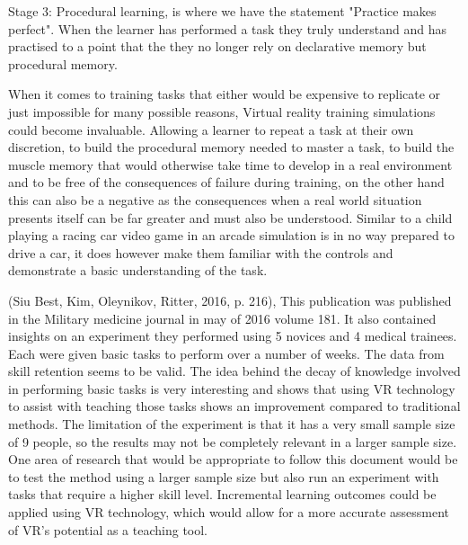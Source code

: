 \documentclass[10pt,journal,compsoc]{IEEEtran}
\begin{document}
	Stage 3: Procedural learning, is where we have the statement "Practice makes perfect". When the learner has performed a task they truly understand and has practised to a point that the they no longer rely on declarative memory but procedural memory. \newline
	
	When it comes to training tasks that either would be expensive to replicate or just impossible for many possible reasons, Virtual reality training simulations could become invaluable. Allowing a learner to repeat a task at their own discretion, to build the procedural memory needed to master a task, to build the muscle memory that would otherwise take time to develop in a real environment and to be free of the consequences of failure during training, on the other hand this can also be a negative as the consequences when a real world situation presents itself can be far greater and must also be understood. Similar to a child playing a racing car video game in an arcade simulation is in no way prepared to drive a car, it does however make them familiar with the controls and demonstrate a basic understanding of the task. \newline
	
	(Siu Best, Kim, Oleynikov, Ritter, 2016, p. 216), This publication was published in the Military medicine journal in may of 2016 volume 181. It also contained insights on an experiment they performed using 5 novices and 4 medical trainees. Each were given basic tasks to perform over a number of weeks. The data from skill retention seems to be valid. The idea behind the decay of knowledge involved in performing basic tasks is very interesting and shows that using VR technology to assist with teaching those tasks shows an improvement compared to traditional methods. The limitation of the experiment is that it has a very small sample size of 9 people, so the results may not be completely relevant in a larger sample size. One area of research that would be appropriate to follow this document would be to test the method using a larger sample size but also run an experiment with tasks that require a higher skill level. Incremental learning outcomes could be applied using VR technology, which would allow for a more accurate assessment of VR's potential as a teaching tool.
	
\end{document}
